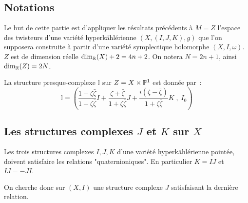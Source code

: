 \documentclass[a4paper,draft]{amsart}
\begin{document}
\subsection{Notations}
\cite{Hitchin-Karlhede} Le but de cette partie est d'appliquer les résultats précédents à $M=Z$ l'espace des twisteurs d'une variété hyperkählérienne $(X,(I,J,K),g)$ que l'on supposera construite à partir d'une variété symplectique holomorphe $(X,I,\omega)$. $Z$ est de dimension réelle $\dim_{\mathbb{R}}(X)+2 = 4n+2$. On notera $N = 2n+1$, ainsi $\dim_{\mathbb{R}}(Z) = 2N$.

La structure presque-complexe $\mathbb{I}$ sur $Z = X \times \mathbb{P}^1$ est donnée par~:
\[
\mathbb{I} = \left(
\dfrac{1-\zeta \bar{\zeta}}{1+\zeta \bar{\zeta}}I + \dfrac{\zeta + \bar{\zeta}}{1+\zeta \bar{\zeta}}J + \dfrac{i(\zeta - \bar{\zeta})}{1+\zeta \bar{\zeta}}K \; , \; I_0
\right)
\]

\subsection{Les structures complexes $J$ et $K$ sur $X$}
Les trois structures complexes $I,J,K$ d'une variété hyperkählérienne pointée, doivent satisfaire les relations "quaternioniques". En particulier $K = IJ$ et $IJ = -JI$.

On cherche donc sur $(X,I)$ une structure complexe $J$ satisfaisant la dernière relation.
\end{document}
